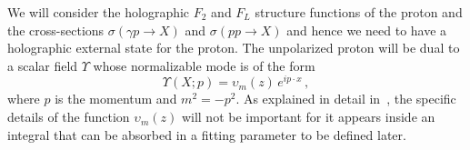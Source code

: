\documentclass[preprint, 12pt]{elsarticle}
\begin{document}
We will consider the holographic $F_2$ and $F_L$ structure functions of the proton and the cross-sections $\sigma\left(\gamma p \rightarrow X\right)$ and $\sigma\left(p p \rightarrow X\right)$ and hence we need to have a holographic external state for the proton.  The unpolarized proton will be dual to a scalar field $\Upsilon$ whose normalizable mode is of the form 
\begin{equation}
\Upsilon(X;p )= \upsilon_m(z) \, e^{i p\cdot x} \,,
\label{eq:proton}
\end{equation}
where $p$ is the momentum and $m^2=-p^2$.
As explained in detail in~\cite{ballon_bayona_unity_2017},
the specific details of the function $\upsilon_m(z)$ will not be important for it appears inside an integral that can be absorbed in a fitting parameter to be defined later.
\end{document}

